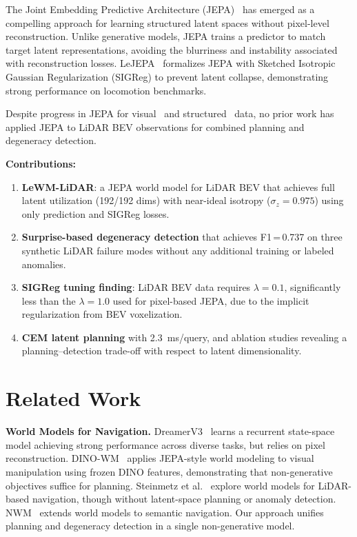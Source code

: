 \documentclass[10pt,twocolumn,letterpaper]{article}
\begin{document}
The Joint Embedding Predictive Architecture (JEPA)~\cite{lecun2022jepa}
has emerged as a compelling approach for learning structured latent spaces
without pixel-level reconstruction. Unlike generative models, JEPA trains
a predictor to match target latent representations, avoiding the
blurriness and instability associated with reconstruction losses.
LeJEPA~\cite{balestriero2024lejepa} formalizes JEPA with Sketched
Isotropic Gaussian Regularization (SIGReg) to prevent latent collapse,
demonstrating strong performance on locomotion benchmarks.

Despite progress in JEPA for visual~\cite{assran2023ijepa} and
structured~\cite{zhu2025adljepa} data, no prior work has applied JEPA
to LiDAR BEV observations for combined planning and degeneracy detection.

\noindent\textbf{Contributions:}
\begin{enumerate}
  \item \textbf{LeWM-LiDAR}: a JEPA world model for LiDAR BEV that
    achieves full latent utilization (192/192 dims) with near-ideal
    isotropy ($\sigma_z{=}0.975$) using only prediction and SIGReg losses.
  \item \textbf{Surprise-based degeneracy detection} that achieves
    F1\,=\,0.737 on three synthetic LiDAR failure modes without any
    additional training or labeled anomalies.
  \item \textbf{SIGReg tuning finding}: LiDAR BEV data requires
    $\lambda{=}0.1$, significantly less than the $\lambda{=}1.0$ used
    for pixel-based JEPA, due to the implicit regularization from
    BEV voxelization.
  \item \textbf{CEM latent planning} with 2.3~ms/query, and ablation
    studies revealing a planning--detection trade-off with respect to
    latent dimensionality.
\end{enumerate}

\section{Related Work}
\label{sec:related}

\noindent\textbf{World Models for Navigation.}
DreamerV3~\cite{hafner2023dreamerv3} learns a recurrent state-space model
achieving strong performance across diverse tasks, but relies on pixel
reconstruction. DINO-WM~\cite{zhou2025dinowm} applies JEPA-style world
modeling to visual manipulation using frozen DINO features, demonstrating
that non-generative objectives suffice for planning. Steinmetz et
al.~\cite{steinmetz2023lidarwm} explore world models for LiDAR-based
navigation, though without latent-space planning or anomaly detection.
NWM~\cite{yang2023nwm} extends world models to semantic navigation.
Our approach unifies planning and degeneracy detection in a single
non-generative model.
\end{document}
